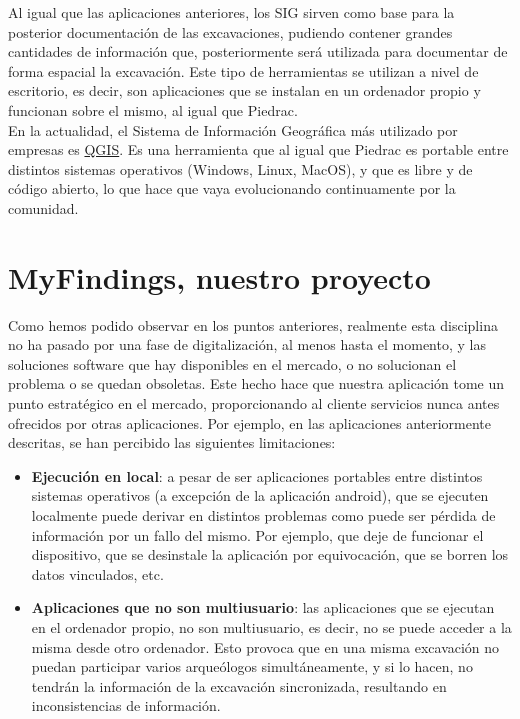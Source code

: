 Al igual que las aplicaciones anteriores, los SIG sirven como base para la posterior
documentación de las excavaciones, pudiendo contener grandes cantidades de información
que, posteriormente será utilizada para documentar de forma espacial la excavación. Este
tipo de herramientas se utilizan a nivel de escritorio, es decir, son aplicaciones que
se instalan en un ordenador propio y funcionan sobre el mismo, al igual que Piedrac.\\

En la actualidad, el Sistema de Información Geográfica más utilizado por empresas es
\href{https://www.qgis.org/es/site/}{QGIS}. Es una herramienta que al igual que Piedrac
es portable entre distintos sistemas operativos (Windows, Linux, MacOS), y que es libre
y de código abierto, lo que hace que vaya evolucionando continuamente por la comunidad.

\section{MyFindings, nuestro proyecto}
Como hemos podido observar en los puntos anteriores, realmente esta disciplina no ha pasado
por una fase de digitalización, al menos hasta el momento, y las soluciones software que hay
disponibles en el mercado, o no solucionan el problema o se quedan obsoletas. Este hecho
hace que nuestra aplicación tome un punto estratégico en el mercado, proporcionando al
cliente servicios nunca antes ofrecidos por otras aplicaciones. Por ejemplo, en las
aplicaciones anteriormente descritas, se han percibido las siguientes limitaciones:

    \begin{itemize}
        \item \textbf{Ejecución en local}: a pesar de ser aplicaciones portables entre
        distintos sistemas operativos (a excepción de la aplicación android), que se
        ejecuten localmente puede derivar en distintos problemas como puede ser pérdida
        de información por un fallo del mismo. Por ejemplo, que deje de funcionar el
        dispositivo, que se desinstale la aplicación por equivocación, que se borren los
        datos vinculados, etc.
        
        \item \textbf{Aplicaciones que no son multiusuario}: las aplicaciones que se
        ejecutan en el ordenador propio, no son multiusuario, es decir, no se puede
        acceder a la misma desde otro ordenador. Esto provoca que en una misma excavación
        no puedan participar varios arqueólogos simultáneamente, y si lo hacen, no tendrán
        la información de la excavación sincronizada, resultando en inconsistencias de
        información.
    \end{itemize}

